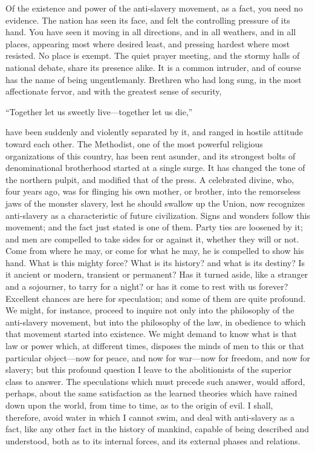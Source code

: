 Of the existence and power of the anti-slavery movement, as a fact, you
need no evidence. The nation has seen its face, and felt the controlling
pressure of its hand. You have seen it moving in all directions, and in
all weathers, and in all places, appearing most where desired least, and
pressing hardest where most resisted. No place is exempt. The quiet
prayer meeting, and the stormy halls of national debate, share its
presence alike. It is a common intruder, and of course has the name of
being ungentlemanly. Brethren who had long sung, in the most
affectionate fervor, and with the greatest sense of security,

``Together let us sweetly live---together let us die,''

have been suddenly and violently separated by it, and ranged in hostile
attitude toward each other. The Methodist, one of the most powerful
religious organizations of this country, has been rent asunder, and its
strongest bolts of denominational brotherhood started at a single surge.
It has changed the tone of the northern pulpit, and modified that of the
press. A celebrated divine, who, four years ago, was for flinging his
own mother, or brother, into the remorseless jaws of the monster
slavery, lest he should swallow up the Union, now recognizes
anti-slavery as a characteristic of future civilization. Signs and
wonders follow this movement; and the fact just stated is one of them.
Party ties are loosened by it; and men are compelled to take sides for
or against it, whether they will or not. Come from where he may, or come
for what he may, he is compelled to show his hand. What is this mighty
force? What is its history? and what is its destiny? Is it ancient or
modern, transient or permanent? Has it turned aside, like a stranger and
a sojourner, to tarry for a night? or has it come to rest with us
forever? Excellent chances are here for speculation; and some of them
are quite profound. We might, for instance, proceed to inquire not
{\protect\hypertarget{459}{}{}}only into the philosophy of the
anti-slavery movement, but into the philosophy of the law, in obedience
to which that movement started into existence. We might demand to know
what is that law or power which, at different times, disposes the minds
of men to this or that particular object---now for peace, and now for
war---now for freedom, and now for slavery; but this profound question I
leave to the abolitionists of the superior class to answer. The
speculations which must precede such answer, would afford, perhaps,
about the same satisfaction as the learned theories which have rained
down upon the world, from time to time, as to the origin of evil. I
shall, therefore, avoid water in which I cannot swim, and deal with
anti-slavery as a fact, like any other fact in the history of mankind,
capable of being described and understood, both as to its internal
forces, and its external phases and relations.

